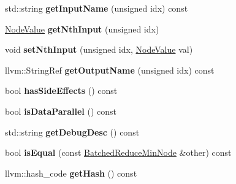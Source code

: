 \begin{DoxyCompactItemize}
\mbox{\label{classglow_1_1_batched_reduce_min_node_a74e92df97444371377342977d145eb31}} 
std\+::string {\bfseries get\+Input\+Name} (unsigned idx) const
\item 
\mbox{\label{classglow_1_1_batched_reduce_min_node_a0750891618dcc2241a6f3c9f570344e1}} 
\hyperlink{structglow_1_1_node_value}{Node\+Value} {\bfseries get\+Nth\+Input} (unsigned idx)
\item 
\mbox{\label{classglow_1_1_batched_reduce_min_node_a8d2a5d87a5e144146b498dff25111082}} 
void {\bfseries set\+Nth\+Input} (unsigned idx, \hyperlink{structglow_1_1_node_value}{Node\+Value} val)
\item 
\mbox{\label{classglow_1_1_batched_reduce_min_node_ad2fccbfe5b4371666d726781b7cec393}} 
llvm\+::\+String\+Ref {\bfseries get\+Output\+Name} (unsigned idx) const
\item 
\mbox{\label{classglow_1_1_batched_reduce_min_node_a3fa39f9dee05af83df16912724f11de3}} 
bool {\bfseries has\+Side\+Effects} () const
\item 
\mbox{\label{classglow_1_1_batched_reduce_min_node_aa80d7b5d8d82b5dda57674213d47b3d9}} 
bool {\bfseries is\+Data\+Parallel} () const
\item 
\mbox{\label{classglow_1_1_batched_reduce_min_node_adaca3f74c70c817e47dc5576f80a0e7f}} 
std\+::string {\bfseries get\+Debug\+Desc} () const
\item 
\mbox{\label{classglow_1_1_batched_reduce_min_node_aa66b00c5377c4dd4710ae4e0541a997b}} 
bool {\bfseries is\+Equal} (const \hyperlink{classglow_1_1_batched_reduce_min_node}{Batched\+Reduce\+Min\+Node} \&other) const
\item 
\mbox{\label{classglow_1_1_batched_reduce_min_node_a0a209123e4ba23109c0250eff1e5a9ce}} 
llvm\+::hash\+\_\+code {\bfseries get\+Hash} () const
\item 

\end{DoxyCompactItemize}

